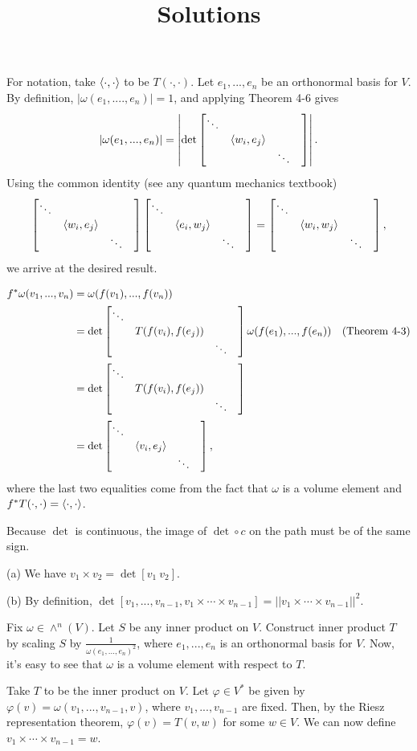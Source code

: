 \documentclass[11pt]{scrartcl}
\begin{document}
\title{Solutions}

\maketitle

\begin{problem*}[4-3]
\end{problem*}

For notation, take $\langle \cdot, \cdot \rangle$ to be $T(\cdot, \cdot)$.
Let $e_1, ..., e_n$ be an orthonormal basis for $V$.
By definition, $|\omega(e_1, ...., e_n)| = 1$, and applying Theorem 4-6 gives 
$$|\omega(e_1, ..., e_n)| = \left|\det\begin{bmatrix} \ddots & & & \\ & \langle w_i, e_j \rangle & & \\ & & \ddots \end{bmatrix}\right|.$$
Using the common identity (see any quantum mechanics textbook)
$$\begin{bmatrix} \ddots & & & \\ & \langle w_i, e_j \rangle & & \\ & & \ddots \end{bmatrix}\begin{bmatrix} \ddots & & & \\ & \langle e_i, w_j \rangle & & \\ & & \ddots \end{bmatrix} = \begin{bmatrix} \ddots & & & \\ & \langle w_i, w_j \rangle & & \\ & & \ddots \end{bmatrix},$$ 
we arrive at the desired result.

\begin{problem*}[4-4]
\end{problem*}

\begin{align*}
    f^*\omega(v_1, ..., v_n) 
    &= 
    \omega(f(v_1), ..., f(v_n)) \\
    &=
    \det\begin{bmatrix} \ddots & & & \\ & T(f(v_i), f(e_j)) & & \\ & & \ddots \end{bmatrix}\omega(f(e_1), ..., f(e_n)) &\text{(Theorem 4-3)} \\
    &=
    \det\begin{bmatrix} \ddots & & & \\ & T(f(v_i), f(e_j)) & & \\ & & \ddots \end{bmatrix}\\
    &= 
    \det\begin{bmatrix} \ddots & & & \\ & \langle v_i, e_j \rangle & & \\ & & \ddots \end{bmatrix},
\end{align*}
where the last two equalities come from the fact that $\omega$ is a volume element and $f^*T(\cdot, \cdot) = \langle \cdot, \cdot \rangle$.

\begin{problem*}[4-5]
\end{problem*}
Because $\det$ is continuous, the image of $\det\circ c$ on the path must be of the same sign.

\begin{problem*}[4-6]
\end{problem*}
(a) We have $v_1\times v_2 = \det[v_1\ v_2]$.

(b) By definition, $\det[v_1, ..., v_{n - 1}, v_1\times\cdots \times v_{n - 1}] = ||v_1\times\cdots \times v_{n - 1}||^2$.

\begin{problem*}[4-7]
\end{problem*}
Fix $\omega\in \wedge^n(V)$.
Let $S$ be any inner product on $V$.
Construct inner product $T$ by scaling $S$ by $\frac{1}{\omega(e_1, ..., e_n)^2}$, 
where $e_1, ..., e_n$ is an orthonormal basis for $V$.
Now, it's easy to see that $\omega$ is a volume element with respect to $T$.

\begin{problem*}[4-8]
\end{problem*}
Take $T$ to be the inner product on $V$.
Let $\varphi\in V^*$ be given by $\varphi(v) = \omega(v_1, ..., v_{n - 1}, v)$, 
where $v_1, ..., v_{n - 1}$ are fixed.
Then, by the Riesz representation theorem, $\varphi(v) = T(v, w)$ for some $w\in V$.
We can now define $v_1\times \cdots \times v_{n - 1} = w$.
\end{document}
